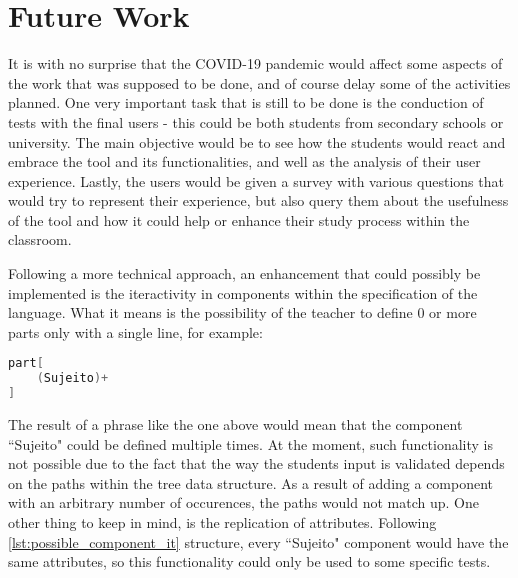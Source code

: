 \section{Future Work}

It is with no surprise that the COVID-19 pandemic would affect some aspects of the work that was supposed to be done, and of course delay some of the activities planned.
One very important task that is still to be done is the conduction of tests with the final users - this could be both students from secondary schools or university.
The main objective would be to see how the students would react and embrace the tool and its functionalities, and well as the analysis of their user experience.
Lastly, the users would be given a survey with various questions that would try to represent their experience,
but also query them about the usefulness of the tool and how it could help or enhance their study process within the classroom.

Following a more technical approach, an enhancement that could possibly be implemented is the iteractivity in components within the specification of the language.
What it means is the possibility of the teacher to define 0 or more parts only with a single line, for example:

\begin{center}
\begin{minipage}{8cm}
\begin{lstlisting}[language=java, basicstyle=\small, label={lst:possible_component_it}, caption=Example of a possible component iteractivity syntax.]
part[
    (Sujeito)+
]
\end{lstlisting}
\end{minipage}
\end{center}

The result of a phrase like the one above would mean that the component ``Sujeito" could be defined multiple times.
At the moment, such functionality is not possible due to the fact that the way the students input is validated depends on the paths within the tree data structure.
As a result of adding a component with an arbitrary number of occurences, the paths would not match up.
One other thing to keep in mind, is the replication of attributes.
Following \autoref{lst:possible_component_it} structure, every ``Sujeito" component would have the same attributes, 
so this functionality could only be used to some specific tests.


